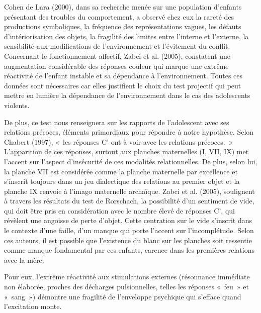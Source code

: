 \documentclass[12pt, a4paper]{book}
\begin{document}
\begin{spacing}{1.5}
Cohen de Lara (2000), dans sa recherche menée sur une population d'enfants présentant des troubles du comportement,  a observé chez eux la rareté des productions symboliques, la fréquence des représentations vagues, les défauts d'intériorisation des objets, la fragilité des limites entre l'interne et l'externe, la sensibilité aux modifications de l'environnement et l'évitement du conflit. Concernant le fonctionnement affectif, Zabci et al. (2005),  constatent une augmentation considérable des réponses couleur qui marque une extrême réactivité de l'enfant instable et sa dépendance à l'environnement. Toutes ces données sont nécessaires car elles justifient le choix du test projectif qui peut mettre en lumière la dépendance de l'environnement dans le cas des adolescents violents.

De plus, ce test nous renseignera  sur les rapports de l'adolescent avec ses relations précoces, éléments primordiaux pour répondre à notre hypothèse. Selon Chabert (1997), « les réponses C' ont à voir avec les relations précoces. » L'apparition de ces réponses, surtout aux planches maternelles (I, VII, IX) met l'accent sur l'aspect d'insécurité de ces modalités relationnelles. De plus, selon lui, la planche VII est considérée comme la planche maternelle par excellence et s'inscrit toujours dans un jeu dialectique des relations au premier objet et la planche IX renvoie à l'imago maternelle archaïque. Zabci et al. (2005),  soulignent à travers les résultats du test de Rorschach, la possibilité d'un sentiment de vide, qui doit être pris en considération avec le nombre élevé de réponses C', qui révèlent une angoisse de perte d'objet. Cette centration sur le vide s'inscrit dans le contexte d'une faille, d'un manque qui porte l'accent sur l'incomplétude. Selon ces auteurs, il est possible que l'existence du blanc sur les planches soit ressentie comme manque fondamental par ces enfants, carence dans les premières relations avec la mère. 

Pour eux, l'extrême réactivité aux stimulations externes (résonnance immédiate non élaborée, proches des décharges pulsionnelles, telles les réponses « feu » et « sang ») démontre une fragilité de l'enveloppe psychique qui s'efface quand l'excitation monte.


\end{spacing}
\end{document}
